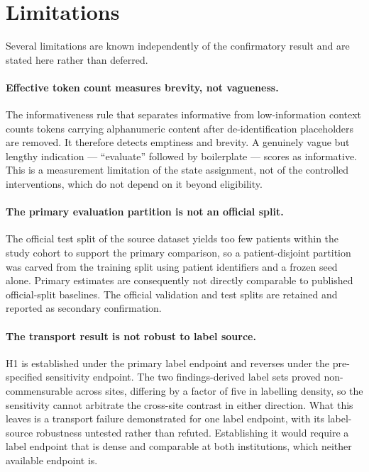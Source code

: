\section{Limitations}
\label{sec:limitations}

Several limitations are known independently of the confirmatory result and are
stated here rather than deferred.

\paragraph{Effective token count measures brevity, not vagueness.}
The informativeness rule that separates informative from low-information context
counts tokens carrying alphanumeric content after de-identification placeholders
are removed. It therefore detects emptiness and brevity. A genuinely vague but
lengthy indication --- ``evaluate'' followed by boilerplate --- scores as
informative. This is a measurement limitation of the state assignment, not of
the controlled interventions, which do not depend on it beyond eligibility.

\paragraph{The primary evaluation partition is not an official split.}
The official test split of the source dataset yields too few patients within the
study cohort to support the primary comparison, so a patient-disjoint partition
was carved from the training split using patient identifiers and a frozen seed
alone. Primary estimates are consequently not directly comparable to published
official-split baselines. The official validation and test splits are retained
and reported as secondary confirmation.

\paragraph{The transport result is not robust to label source.}
H1 is established under the primary label endpoint and reverses under the
pre-specified sensitivity endpoint. The two findings-derived label sets proved
non-commensurable across sites, differing by a factor of five in labelling
density, so the sensitivity cannot arbitrate the cross-site contrast in either
direction. What this leaves is a transport failure demonstrated for one label
endpoint, with its label-source robustness untested rather than refuted.
Establishing it would require a label endpoint that is dense and comparable at
both institutions, which neither available endpoint is.

